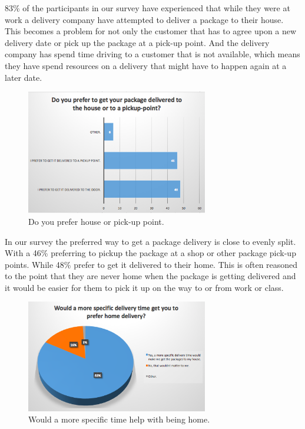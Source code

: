 \documentclass[12pt]{report}
\begin{document}
 83\% of the participants in our survey have experienced that while they were at work a delivery company have attempted to deliver a package to their house. This becomes a problem for not only the customer that has to agree upon a new delivery date or pick up the package at a pick-up point. And the delivery company has spend time driving to a customer that is not available, which means they have spend resources on a delivery that might have to happen again at a later date.

\begin{figure}[H]
  \centering
  \includegraphics[width=300]{pics/houseorpickuppoint.png}
  \caption{Do you prefer house or pick-up point.}
  \label{fig: Customer satisfaction}
\end{figure}

In our survey the preferred way to get a package delivery is close to evenly split. With a 46\% preferring to pickup the package at a shop or other package pick-up points. While 48\% prefer to get it delivered to their home. 
This is often reasoned to the point that they are never home when the package is getting delivered and it would be easier for them to pick it up on the way to or from work or class.


\begin{figure}[H]
  \centering
  \includegraphics[width=300]{pics/morespecific.png}
  \caption{Would a more specific time help with being home.}
  \label{fig: Customer satisfaction}
\end{figure}
\end{document}
